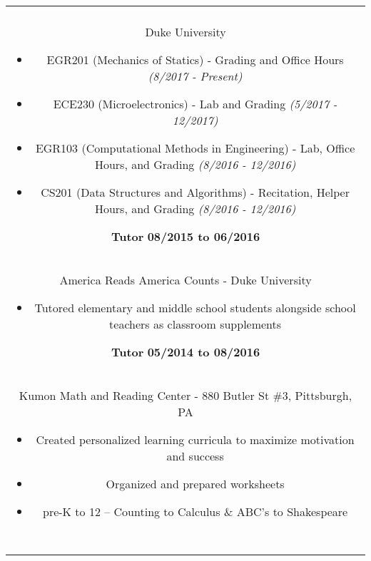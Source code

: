 \documentclass[11pt]{amsart}
\begin{document}
\begin{center}
\begin{tabular}{c}
\begin{minipage}{\textwidth}
		{\bf Teaching Assistant} \hfill {\bf 08/2016 to present}\\
		{Duke University}
		\begin{itemize}
			\item EGR201 (Mechanics of Statics) - Grading and Office Hours {\it (8/2017 - Present)}
			\item ECE230 (Microelectronics) - Lab and Grading {\it (5/2017 - 12/2017)}
			\item EGR103 (Computational Methods in Engineering) - Lab, Office Hours, and Grading {\it (8/2016 - 12/2016)}
			\item CS201 (Data Structures and Algorithms) - Recitation, Helper Hours, and Grading {\it (8/2016 - 12/2016)}
		\end{itemize}
		
		{\bf Tutor} \hfill {\bf 08/2015 to 06/2016}\\
		{America Reads America Counts - Duke University}
		\begin{itemize}
			\item Tutored elementary and middle school students alongside school teachers as classroom supplements
		\end{itemize}
		
		{\bf Tutor} \hfill {\bf 05/2014 to 08/2016}\\
		{Kumon Math and Reading Center - 880 Butler St \#3, Pittsburgh, PA}
		\begin{itemize}
			\item Created personalized learning curricula to maximize motivation and success
			\item Organized and prepared worksheets
			\item pre-K to 12 -- Counting to Calculus \& ABC's to Shakespeare
		\end{itemize}
	\end{minipage}\\~\\
	

\end{tabular}
\end{center}
\end{document}
